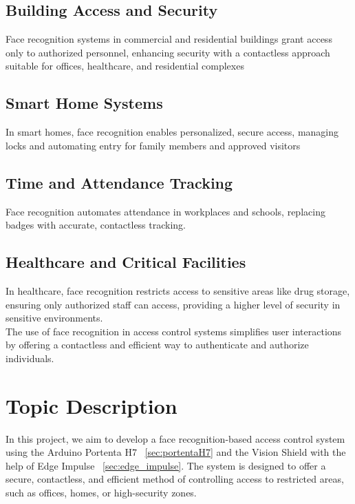 \subsection{Building Access and Security}
Face recognition systems in commercial and residential buildings grant access only to authorized personnel, enhancing security with a contactless approach suitable for offices, healthcare, and residential complexes   \cite{Blog_norden:2024}

\subsection{Smart Home Systems}
In smart homes, face recognition enables personalized, secure access, managing locks and automating entry for family members and approved visitors \cite{ieee:2021}

\subsection{Time and Attendance Tracking}
Face recognition automates attendance in workplaces and schools, replacing badges with accurate, contactless tracking. \cite{attenface:2022}

\subsection{Healthcare and Critical Facilities}
In healthcare, face recognition restricts access to sensitive areas like drug storage, ensuring only authorized staff can access, providing a higher level of security in sensitive environments. \cite{cyberlink:2024}
\\

The use of face recognition in access control systems simplifies user interactions by offering a contactless and efficient way to authenticate and authorize individuals.

\section{Topic Description}

In this project, we aim to develop a face recognition-based access control system using the Arduino Portenta H7 ~\ref{sec:portentaH7} and the Vision Shield with the help of Edge Impulse ~\ref{sec:edge_impulse}. The system is designed to offer a secure, contactless, and efficient method of controlling access to restricted areas, such as offices, homes, or high-security zones.

